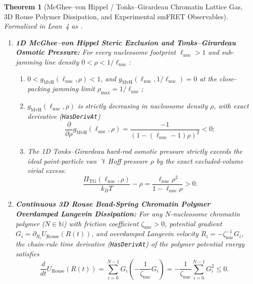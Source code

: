 \documentclass[11pt,a4paper]{article}
\newtheorem{theorem}{Theorem}[section]
\theoremstyle{definition}
\begin{document}
\begin{theorem}[McGhee--von Hippel / Tonks--Girardeau Chromatin Lattice Gas, 3D Rouse Polymer Dissipation, and Experimental smFRET Observables]
\label{thm:mcghee_tonks_rouse}
Formalized in Lean~4 as \texttt{}.
\begin{enumerate}
  \item \textbf{1D McGhee--von Hippel Steric Exclusion and Tonks--Girardeau Osmotic Pressure:} For every nucleosome footprint $\ell_{\mathrm{nuc}} > 1$ and sub-jamming line density $0 < \rho < 1/\ell_{\mathrm{nuc}}$:
  \begin{enumerate}
    \item $0 < g_{\mathrm{MvH}}(\ell_{\mathrm{nuc}}, \rho) < 1$, and $g_{\mathrm{MvH}}(\ell_{\mathrm{nuc}}, 1/\ell_{\mathrm{nuc}}) = 0$ at the close-packing jamming limit $\rho_{\max} = 1/\ell_{\mathrm{nuc}}$;
    \item $g_{\mathrm{MvH}}(\ell_{\mathrm{nuc}}, \rho)$ is strictly decreasing in nucleosome density $\rho$, with exact derivative (\texttt{HasDerivAt})
    \begin{equation}
      \frac{\partial}{\partial\rho}g_{\mathrm{MvH}}(\ell_{\mathrm{nuc}}, \rho) = \frac{-1}{\left(1 - (\ell_{\mathrm{nuc}} - 1)\rho\right)^2} < 0;
    \end{equation}
    \item The 1D Tonks--Girardeau hard-rod osmotic pressure strictly exceeds the ideal point-particle van~'t~Hoff pressure $\rho$ by the exact excluded-volume virial excess:
    \begin{equation}
      \frac{\Pi_{\mathrm{TG}}(\ell_{\mathrm{nuc}}, \rho)}{k_B T} - \rho = \frac{\ell_{\mathrm{nuc}}\rho^2}{1 - \ell_{\mathrm{nuc}}\rho} > 0.
    \end{equation}
  \end{enumerate}
  \item \textbf{Continuous 3D Rouse Bead-Spring Chromatin Polymer Overdamped Langevin Dissipation:} For any $N$-nucleosome chromatin polymer ($N \in \mathbb{N}$) with friction coefficient $\zeta_{\mathrm{nuc}} > 0$, potential gradient $G_i = \partial_{R_i}U_{\mathrm{Rouse}}(R(t))$, and overdamped Langevin velocity $\dot{R}_i = -\zeta_{\mathrm{nuc}}^{-1} G_i$, the chain-rule time derivative (\texttt{HasDerivAt}) of the polymer potential energy satisfies
  \begin{equation}
    \frac{d}{dt}U_{\mathrm{Rouse}}(R(t)) = \sum_{i=0}^{N-1} G_i\left(-\frac{1}{\zeta_{\mathrm{nuc}}}G_i\right) = -\frac{1}{\zeta_{\mathrm{nuc}}}\sum_{i=0}^{N-1} G_i^2 \le 0.

\end{equation}
\end{enumerate}
\end{theorem}
\end{document}

